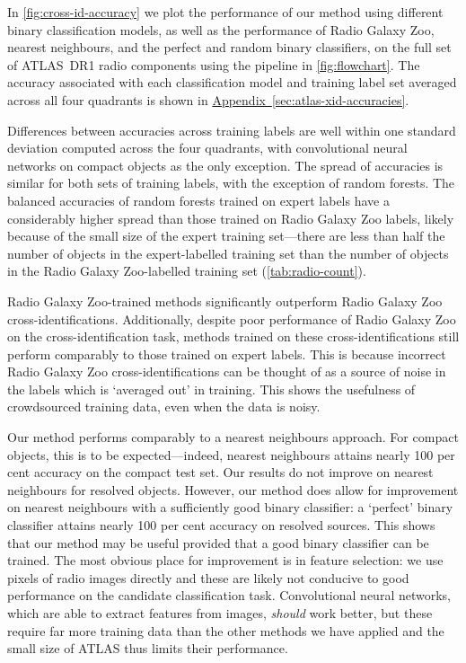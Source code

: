\documentclass[11pt, a4paper]{book}
\newcommand{\aref}[1]{\hyperref[#1]{Appendix~\ref{#1}}}
\begin{document}
    In \autoref{fig:cross-id-accuracy} we plot the performance {of our
    method using different binary classification models}, as well as the
    performance of Radio Galaxy Zoo, nearest neighbours, and the perfect and
    random binary classifiers, on the full set of ATLAS~DR1 radio components
    using the pipeline in \autoref{fig:flowchart}. The accuracy
    {associated with each classification model} and training label set
    averaged across all four quadrants is shown in \aref{sec:atlas-xid-accuracies}.

    Differences between accuracies across training labels are well within one
    standard deviation computed across the four quadrants, with convolutional
    neural networks on compact objects as the only exception. The spread of
    accuracies is similar for both sets of training labels, with the exception
    of random forests. The balanced accuracies of random forests trained on
    expert labels have a considerably higher spread than those trained on
    Radio Galaxy Zoo labels, likely because of the small size of the expert
    training set---there are less than half the number of objects in the
    expert-labelled training set than the number of objects in the Radio
    Galaxy Zoo-labelled training set (\autoref{tab:radio-count}).

    Radio Galaxy Zoo-trained methods significantly outperform Radio Galaxy Zoo
    cross-identifications. Additionally, despite poor performance of Radio
    Galaxy Zoo on the cross-identification task, methods trained on these
    cross-identifications still perform comparably to those trained on expert
    labels. This is because incorrect Radio Galaxy Zoo cross-identifications
    can be thought of as a source of noise in the labels which is `averaged out'
    in training. This shows the usefulness of crowdsourced training data, even
    when the data is noisy.

    Our method performs comparably to a nearest neighbours approach. For
    compact objects, this is to be expected---indeed, nearest neighbours
    attains nearly 100 per cent accuracy on the compact test set. Our results
    do not improve on nearest neighbours for resolved objects. However, our
    method does allow for improvement on nearest neighbours with a
    sufficiently good binary classifier: a `perfect' binary classifier attains
    nearly 100 per cent accuracy on resolved sources. This shows that our
    method may be useful provided that a good binary classifier can be
    trained. The most obvious place for improvement is in feature selection:
    we use pixels of radio images directly and these are likely not conducive
    to good performance on the candidate classification task. Convolutional
    neural networks, which are able to extract features from images,
    \emph{should} work better, but these require far more training data than
    the other methods we have applied and the small size of ATLAS thus limits their performance.
\end{document}
